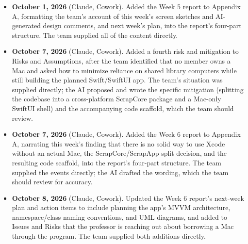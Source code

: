 \begin{itemize}[leftmargin=1.4em]
\item \textbf{October 1, 2026} (Claude, Cowork). Added the Week 5 report to Appendix A, formatting the team's account of this week's screen sketches and AI-generated design comments, and next week's plan, into the report's four-part structure. The team supplied all of the content directly.

\item \textbf{October 7, 2026} (Claude, Cowork). Added a fourth risk and mitigation to Risks and Assumptions, after the team identified that no member owns a Mac and asked how to minimize reliance on shared library computers while still building the planned Swift/SwiftUI app. The team's situation was supplied directly; the AI proposed and wrote the specific mitigation (splitting the codebase into a cross-platform ScrapCore package and a Mac-only SwiftUI shell) and the accompanying code scaffold, which the team should review.

\item \textbf{October 7, 2026} (Claude, Cowork). Added the Week 6 report to Appendix A, narrating this week's finding that there is no solid way to use Xcode without an actual Mac, the ScrapCore/ScrapApp split decision, and the resulting code scaffold, into the report's four-part structure. The team supplied the events directly; the AI drafted the wording, which the team should review for accuracy.

\item \textbf{October 8, 2026} (Claude, Cowork). Updated the Week 6 report's next-week plan and action items to include planning the app's MVVM architecture, namespace/class naming conventions, and UML diagrams, and added to Issues and Risks that the professor is reaching out about borrowing a Mac through the program. The team supplied both additions directly.

\end{itemize}
